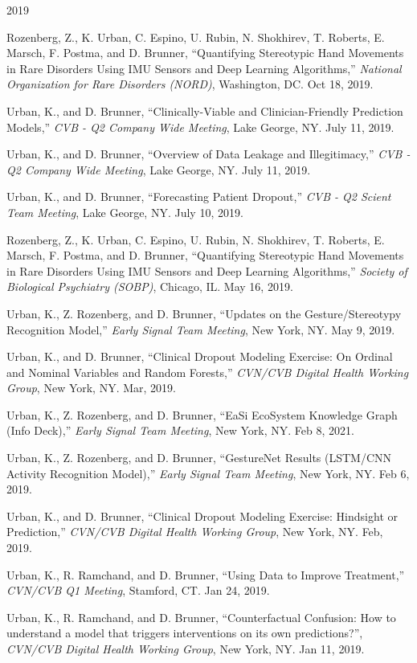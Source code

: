 \begin{center} \Large{2019} \end{center}
\normalsize
\begin{itemize*}
  \item
    Rozenberg, Z., K. Urban, C. Espino, U. Rubin, N. Shokhirev, T. Roberts, E. Marsch, F. Postma, and D. Brunner,
    ``Quantifying Stereotypic Hand Movements in Rare Disorders Using IMU Sensors and Deep Learning Algorithms,''
    {\em National Organization for Rare Disorders (NORD)},
    Washington, DC.  Oct 18, 2019.
  \item
    Urban, K., and D. Brunner, 
    ``Clinically-Viable and Clinician-Friendly Prediction Models,''
    {\em CVB - Q2 Company Wide Meeting},
    Lake George, NY.  July 11, 2019.
  \item
    Urban, K., and D. Brunner, 
    ``Overview of Data Leakage and Illegitimacy,''
    {\em CVB - Q2 Company Wide Meeting}, Lake George, NY. 
    July 11, 2019.
  \item
    Urban, K., and D. Brunner, 
    ``Forecasting Patient Dropout,'' %
    {\em CVB - Q2 Scient Team Meeting},
    Lake George, NY.  July 10, 2019.
  \item
    Rozenberg, Z., K. Urban, C. Espino, U. Rubin, N. Shokhirev, T. Roberts, E. Marsch, F. Postma, and D. Brunner,
    ``Quantifying Stereotypic Hand Movements in Rare Disorders Using IMU Sensors and Deep Learning Algorithms,''
    {\em Society of Biological Psychiatry (SOBP)},
    Chicago, IL.  May 16, 2019.
  \item
    Urban, K., Z. Rozenberg, and D. Brunner, 
    ``Updates on the Gesture/Stereotypy Recognition Model,''
    {\em Early Signal Team Meeting},
    New York, NY.  May 9, 2019.
  \item
    Urban, K., and D. Brunner, 
    ``Clinical Dropout Modeling Exercise: On Ordinal and Nominal Variables and Random Forests,''
    {\em CVN/CVB Digital Health Working Group},
    New York, NY.  Mar, 2019.
  \item
    Urban, K., Z. Rozenberg, and D. Brunner, 
    ``EaSi EcoSystem Knowledge Graph (Info Deck),''
    {\em Early Signal Team Meeting},
    New York, NY.  Feb 8, 2021.
  \item
    Urban, K., Z. Rozenberg, and D. Brunner, 
    ``GestureNet Results (LSTM/CNN Activity Recognition Model),''
    {\em Early Signal Team Meeting}, 
    New York, NY.  Feb 6, 2019.
  \item
    Urban, K., and D. Brunner, 
    ``Clinical Dropout Modeling Exercise: Hindsight or Prediction,''
    {\em CVN/CVB Digital Health Working Group}, 
    New York, NY.  Feb, 2019.
  \item
    Urban, K., R. Ramchand, and D. Brunner, 
    ``Using Data to Improve Treatment,''
    {\em CVN/CVB Q1 Meeting},
    Stamford, CT. Jan 24, 2019.
  \item
    Urban, K., R. Ramchand, and D. Brunner, 
    ``Counterfactual Confusion: How to understand a model that triggers interventions on its own predictions?'',
    {\em CVN/CVB Digital Health Working Group},
    New York, NY.  Jan 11, 2019.
\end{itemize*}



